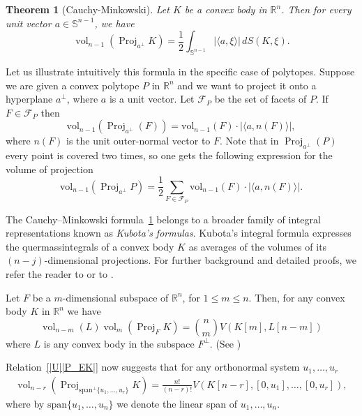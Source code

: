 \documentclass[10pt]{amsart}
\newcommand{\ls}{\leqslant}
\newcommand{\1}{\textbf{1}}
\DeclareMathOperator{\vol}{vol}
\numberwithin{equation}{section} %
\newtheorem{theorem}{Theorem}[section] %
\theoremstyle{remark}
\theoremstyle{definition}
\begin{document}
\begin{theorem}[Cauchy-Minkowski]\label{C-M}
    Let $K$   be a convex body in $\mathbb{R}^{n}$. Then for every unit vector $a \in \mathbb{S}^{n-1}$, we have 
    \[
    \vol_{n-1}(\operatorname{Proj}_{a^{\perp}}K)=\frac{1}{2}\int_{\mathbb{S}^{n-1}} \left| \langle a,\xi\rangle \right| \,dS(K,\xi).
    \]
\end{theorem}
Let us illustrate intuitively this formula in the specific case of polytopes. Suppose we are given a convex polytope $P$ in $\mathbb{R}^n$ and we want to project it onto a hyperplane $a^\perp$, where $a$ is a unit vector. Let $\mathscr{F}_P$ be the set of facets of $P$. If $F \in \mathscr{F}_P$ then
\[
\text{vol}_{n-1}(\operatorname{Proj}_{a^\perp}(F)) = \text{vol}_{n-1}(F) \cdot |\langle a, n(F) \rangle|,
\]
where $n(F)$ is the unit outer-normal vector to $F$. Note that in $\operatorname{Proj}_{a^\perp}(P)$ every point is covered two times, so one gets the
following expression for the volume of projection
\begin{equation}\label{Cauchy-proj}
\text{vol}_{n-1}(\operatorname{Proj}_{a^\perp} P) = \frac{1}{2} \sum_{F \in \mathscr{F}_P} \text{vol}_{n-1}(F) \cdot |\langle a, n(F) \rangle|.
\end{equation}
 
The Cauchy–Minkowski formula~\ref{C-M} belongs to a broader family of integral representations known as \emph{Kubota’s formulas}.  
Kubota’s integral formula expresses the quermassintegrals of a convex body $K$ as averages of the volumes of its $(n-j)$-dimensional projections. For further background and detailed proofs, we refer the reader to \cite[Theorem~8.1.10 and (A.49)]{gardner2006geometric} or to \cite[Appendix~B]{ArtsteinAvidanGiannopoulosMilman2015}.

Let $F$ be a $m$-dimensional subspace of $\mathbb{R}^n$, for $1\ls m \ls n$. Then, for any convex body $K$ in $\mathbb{R}^n$ we have 
\begin{equation}\label{|U||P_EK|}
    \operatorname{vol}_{n-m}(L) \operatorname{vol}_m(\operatorname{Proj}_F K)=\binom{n}{m}V(K[m],L[n-m])
\end{equation}
where $L$ is any convex body in the subspace $F^{\perp}$. (See \cite[Theorem 5.3.1]{schneider2013convex})


Relation~\eqref{|U||P_EK|} now suggests that for any orthonormal system $u_1,\ldots,u_r$  
\begin{align*}\label{mixed vol formula for proj}
\operatorname{vol}_{n-r}(\operatorname{Proj}_{\text{span}^{\perp}\{u_1,\ldots,u_r\}}K)=\frac{n!}{(n-r)!}V(K[n-r],[0,u_1],\ldots,[0,u_r]),
\end{align*}
 where by $\text{span}\{ u_1,\ldots,u_n\}$ we denote the linear span of $u_1,\ldots,u_n$.
\end{document}
